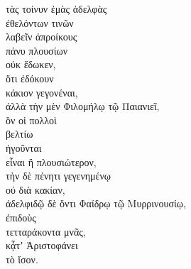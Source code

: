 {\large
\begin{greek}
\noindent τὰς τοίνυν ἐμὰς ἀδελφὰς \\
\tabto{2em} ἐθελόντων τινῶν \\
\tabto{4em} λαβεῖν ἀπροίκους \\
\tabto{2em} πάνυ πλουσίων \\
οὐκ ἔδωκεν, \\
\tabto{2em} ὅτι ἐδόκουν \\
\tabto{4em} κάκιον γεγονέναι, \\
ἀλλὰ τὴν μὲν Φιλομήλῳ τῷ Παιανιεῖ, \\
\tabto{2em} ὃν οἱ πολλοὶ \\
\tabto{4em} βελτίω \\
\tabto{2em} ἡγοῦνται \\
\tabto{4em} εἶναι ἢ πλουσιώτερον, \\
τὴν δὲ πένητι γεγενημένῳ \\
\tabto{2em} οὐ διὰ κακίαν, \\
ἀδελφιδῷ δὲ ὄντι Φαίδρῳ τῷ Μυρρινουσίῳ, \\
ἐπιδοὺς \\
\tabto{2em} τετταράκοντα μνᾶς, \\
κᾆτʼ Ἀριστοφάνει \\
\tabto{2em} τὸ ἴσον.\\

\end{greek}
}

